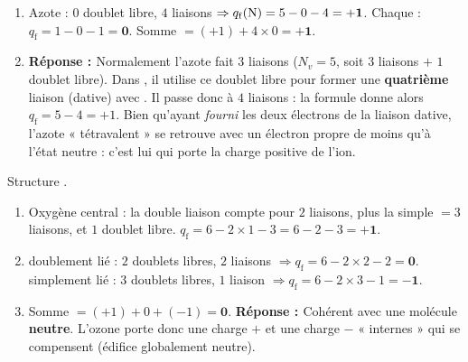 \documentclass[11pt,a4paper]{article}
\newcommand{\rep}{\textbf{\textcolor{corcol}{Réponse : }}}
\begin{document}
\begin{cor}
\begin{enumerate}[label=\alph*),leftmargin=2em,itemsep=2pt]
  \item Azote : $0$ doublet libre, $4$ liaisons $\Rightarrow q_{\mathrm{f}}(\ce{N}) = 5 - 0 - 4 = \mathbf{+1}$.\;
        Chaque  : $q_{\mathrm{f}} = 1 - 0 - 1 = \mathbf{0}$.\;
        Somme $= (+1) + 4\times 0 = \mathbf{+1}$. \checkmark
  \item \rep Normalement l'azote fait $3$ liaisons ($N_v = 5$, soit $3$ liaisons $+$ $1$ doublet
        libre). Dans , il utilise ce doublet libre pour former une \textbf{quatrième}
        liaison (dative) avec . Il passe donc à $4$ liaisons : la formule donne alors
        $q_{\mathrm{f}} = 5 - 4 = +1$. Bien qu'ayant \emph{fourni} les deux électrons de la liaison
        dative, l'azote « tétravalent » se retrouve avec un électron propre de moins qu'à l'état
        neutre : c'est lui qui porte la charge positive de l'ion.
\end{enumerate}
\end{cor}

\begin{cor}
Structure .
\begin{enumerate}[label=\alph*),leftmargin=2em,itemsep=2pt]
  \item Oxygène central : la double liaison compte pour $2$ liaisons, plus la simple $=3$ liaisons,
        et $1$ doublet libre.\;
        $q_{\mathrm{f}} = 6 - 2\times 1 - 3 = 6 - 2 - 3 = \mathbf{+1}$.
  \item {} doublement lié : $2$ doublets libres, $2$ liaisons $\Rightarrow
        q_{\mathrm{f}} = 6 - 2\times 2 - 2 = \mathbf{0}$.\\
         simplement lié : $3$ doublets libres, $1$ liaison $\Rightarrow
        q_{\mathrm{f}} = 6 - 2\times 3 - 1 = \mathbf{-1}$.
  \item Somme $= (+1) + 0 + (-1) = \mathbf{0}$. \checkmark\;
        \rep Cohérent avec une molécule \textbf{neutre}. L'ozone porte donc une charge $+$ et une
        charge $-$ « internes » qui se compensent (édifice globalement neutre).
\end{enumerate}
\end{cor}
\end{document}
